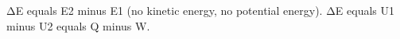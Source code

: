 ΔE equals E2 minus E1 (no kinetic energy, no potential energy).  
ΔE equals U1 minus U2 equals Q minus W.
